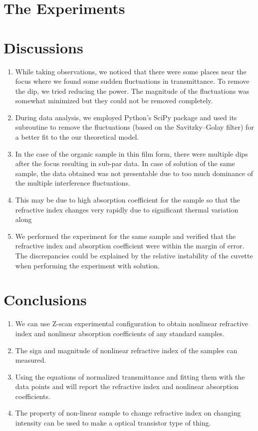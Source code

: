 \documentclass[%
 reprint,
 amsmath,amssymb,
 aps,
]{revtex4-2}
\begin{document}
		
		
\section{The Experiments}
		
\section{Discussions}
	\begin{enumerate}
		\item While taking observations, we noticed that there were
		some places near the focus where we found some sudden fluctuations in transmittance. To remove the dip, we
		tried reducing the power. The magnitude of the fluctuations was somewhat minimized but they could not be removed completely. 
		\item During data analysis, we employed Python's SciPy package and used its subroutine to remove the fluctuations (based on the Savitzky–Golay filter) for a better fit to the our theoretical model. 
		\item In the case of the organic sample in thin film form, there were multiple dips after the focus resulting in sub-par data. In case of solution of the same sample, the data obtained was not presentable due
		to too much dominance of the multiple interference
		fluctuations. 
		\item This may be due to high absorption coefficient
		for the sample so that the refractive index changes
		very rapidly due to significant thermal variation along
		\item We performed the experiment for the same sample and verified that the refractive index and absorption coefficient were within the margin of error. The discrepancies could be explained by the relative instability of the cuvette when performing the experiment with solution.
	\end{enumerate}
	
	
\section{Conclusions}
	\begin{enumerate}
		\item We can use Z-scan experimental configuration to obtain nonlinear refractive
		index and nonlinear absorption coefficients of any standard samples. 
		\item The
		sign and magnitude of nonlinear refractive index of the samples can measured. 
		\item Using the equations of normalized transmittance and fitting
		them with the data points and will report the refractive index and nonlinear
		absorption coefficients.
		\item The property of non-linear sample to change refractive index on changing intensity can be used to make a optical transistor
		type of thing.
	\end{enumerate}
\end{document}
